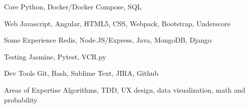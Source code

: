

\begin{cvskills}

  \cvskill
    {Core}
    {Python, Docker/Docker Compose, SQL}

  \cvskill
    {Web}
    {Javascript, Angular, HTML5, CSS, Webpack, Bootstrap, Underscore}

  \cvskill
    {Some Experience}
    {Redis, Node.JS/Express, Java, MongoDB, Django}

  \cvskill
    {Testing}
    {Jasmine, Pytest, VCR.py}

  \cvskill
    {Dev Tools}
    {Git, Bash, Sublime Text, JIRA, Github}

  \cvskill
    {Areas of Expertise}
    {Algorithms, TDD, UX design, data visualization, math and probability}

\end{cvskills}

